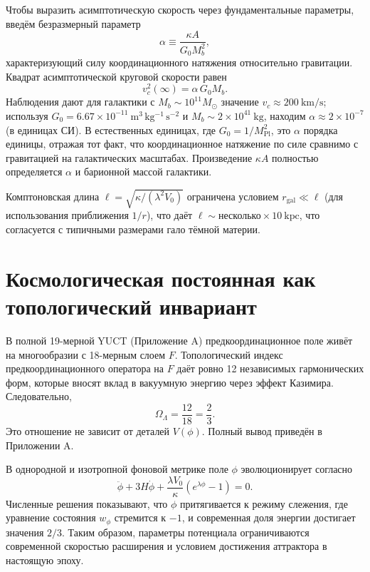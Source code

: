 \documentclass[12pt,a4paper]{article}
\begin{document}
	Чтобы выразить асимптотическую скорость через фундаментальные параметры, введём безразмерный параметр
	\begin{equation}
		\alpha \equiv \frac{\kappa A}{G_0 M_b^2},
		\label{eq:alpha}
	\end{equation}
	характеризующий силу координационного натяжения относительно гравитации. Квадрат асимптотической круговой скорости равен
	\begin{equation}
		v_c^2(\infty) = \alpha\, G_0 M_b.
		\label{eq:vc-squared}
	\end{equation}
	Наблюдения дают для галактики с \(M_b \sim 10^{11}M_\odot\) значение \(v_c \approx 200\ \mathrm{km/s}\); используя \(G_0 = 6.67\times 10^{-11}\ \mathrm{m^3\,kg^{-1}\,s^{-2}}\) и \(M_b \sim 2\times 10^{41}\ \mathrm{kg}\), находим \(\alpha \approx 2 \times 10^{-7}\) (в единицах СИ). В естественных единицах, где \(G_0 = 1/M_{\mathrm{Pl}}^2\), это \(\alpha\) порядка единицы, отражая тот факт, что координационное натяжение по силе сравнимо с гравитацией на галактических масштабах. Произведение \(\kappa A\) полностью определяется \(\alpha\) и барионной массой галактики.
	
	Комптоновская длина \(\ell = \sqrt{\kappa/(\lambda^2 V_0)}\) ограничена условием \(r_{\mathrm{gal}} \ll \ell\) (для использования приближения \(1/r\)), что даёт \(\ell \sim \text{несколько}\times 10\ \mathrm{kpc}\), что согласуется с типичными размерами гало тёмной материи.
	
	\section{Космологическая постоянная как топологический инвариант}
	
	В полной 19-мерной YUCT (Приложение A) предкоординационное поле живёт на многообразии с 18-мерным слоем \(F\). Топологический индекс предкоординационного оператора на \(F\) даёт ровно 12 независимых гармонических форм, которые вносят вклад в вакуумную энергию через эффект Казимира. Следовательно,
	\begin{equation}
		\Omega_\Lambda = \frac{12}{18} = \frac{2}{3}.
		\label{eq:OmegaLambda}
	\end{equation}
	Это отношение не зависит от деталей \(V(\phi)\). Полный вывод приведён в Приложении A.
	
	В однородной и изотропной фоновой метрике поле \(\phi\) эволюционирует согласно
	\[
	\ddot\phi + 3H \dot\phi + \frac{\lambda V_0}{\kappa}(e^{\lambda\phi}-1) = 0.
	\]
	Численные решения показывают, что \(\phi\) притягивается к режиму слежения, где уравнение состояния \(w_\phi\) стремится к \(-1\), и современная доля энергии достигает значения \(2/3\). Таким образом, параметры потенциала ограничиваются современной скоростью расширения и условием достижения аттрактора в настоящую эпоху.
	
\end{document}
